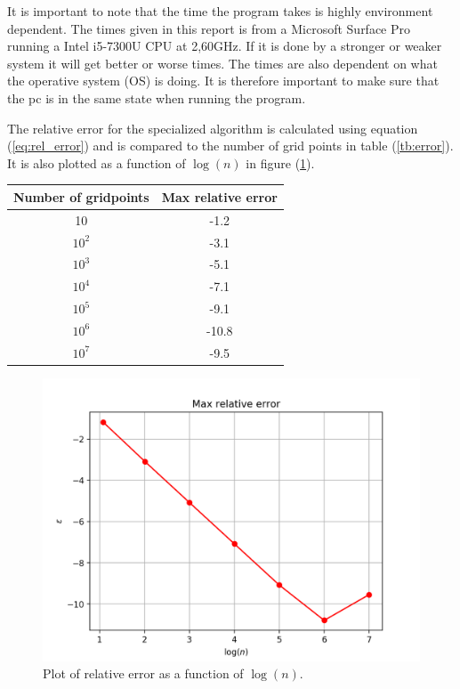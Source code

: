 \documentclass[12pt]{article}
\begin{document}
It is important to note that the time the program takes is highly environment dependent. The times given in this report is from a Microsoft Surface Pro running a Intel i5-7300U CPU at 2,60GHz. If it is done by a stronger or weaker system it will get better or worse times. The times are also dependent on what the operative system (OS) is doing. It is therefore important to make sure that the pc is in the same state when running the program.
\hfill\break

The relative error for the specialized algorithm is calculated using equation (\ref{eq:rel_error}) and is compared to the number of grid points in table (\ref{tb:error}). It is also plotted as a function of $\log{(n)}$ in figure (\ref{fig:rel_error}).


\begin{center}
  \label{tb:error}
  \begin{tabular}{||c|c||}

    \hline\hline Number of gridpoints & Max relative error \\
    \hline
    10 & -1.2 \\
    \hline
    $10^2$ & -3.1 \\
    \hline
    $10^3$ & -5.1 \\ 
    \hline
    $10^4$ & -7.1 \\
    \hline
    $10^5$ & -9.1 \\ 
    \hline
    $10^6$ & -10.8\\
    \hline
    $10^7$ & -9.5\\
    \hline\hline
    
  \end{tabular}
\end{center}

\begin{figure}[H]
  \centering  
  \includegraphics[scale=0.5]{relative_error.png}
  \caption{Plot of relative error as a function of $\log{(n)}$.}
  \label{fig:rel_error}
\end{figure}
\end{document}
